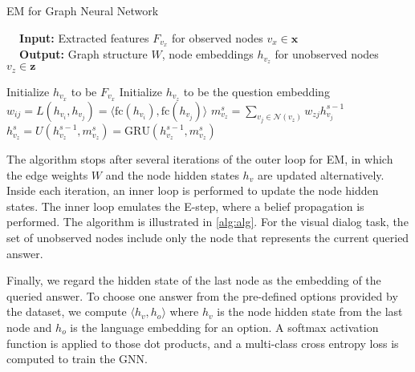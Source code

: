 \documentclass[10pt,twocolumn,letterpaper]{article}
\begin{document}
\begin{algorithm}[!t]\small
\caption{\small EM for Graph Neural Network}
\label{alg:alg}
\begin{flushleft}
\textbf{~~Input:} Extracted features $F_{v_x}$ for observed nodes $v_x \in \bm{x}$\\
\textbf{~~Output:} Graph structure $W$, node embeddings $h_{v_z}$ for unobserved nodes $v_z\!\in\!\bm{z}$
\end{flushleft}
\vspace{-10pt}
\begin{algorithmic}[1]
\STATE Initialize $h_{v_x}$ to be $F_{v_x}$
\ENDFOR
{}
\STATE Initialize $h_{v_z}$ to be the question embedding
\ENDFOR
{}
\STATE $w_{ij} = L(h_{v_{i}}, h_{v_{j}}) = \langle \text{fc}(h_{v_i}), \text{fc}(h_{v_j}) \rangle$
\ENDFOR
{}
\STATE $m_{v_{z}}^{s} = \sum\nolimits_{v_{j}\in\mathcal{N}(v_{z})} w_{zj} h_{v_{j}}^{s-1}$
\STATE $h_{v_{z}}^{s} = U(h_{v_{z}}^{s-1}, m_{v_{z}}^{s}) = \text{GRU}(h_{v_{z}}^{s-1}, m_{v_{z}}^{s})$
\ENDFOR
\ENDFOR
\ENDWHILE
\end{algorithmic}
\end{algorithm}

The algorithm stops after several iterations of the outer loop for EM, in which the edge weights $W$ and the node hidden states $h_v$ are updated alternatively. Inside each iteration, an inner loop is performed to update the node hidden states. The inner loop emulates the E-step, where a belief propagation is performed. The algorithm is illustrated in \autoref{alg:alg}. For the visual dialog task, the set of unobserved nodes include only the node that represents the current queried answer.

Finally, we regard the hidden state of the last node as the embedding of the queried answer. To choose one answer from the pre-defined options provided by the dataset, we compute $\langle h_v, h_o \rangle$ where $h_v$ is the node hidden state from the last node and $h_o$ is the language embedding for an option. A softmax activation function is applied to those dot products, and a multi-class cross entropy loss is computed to train the GNN.
\end{document}
